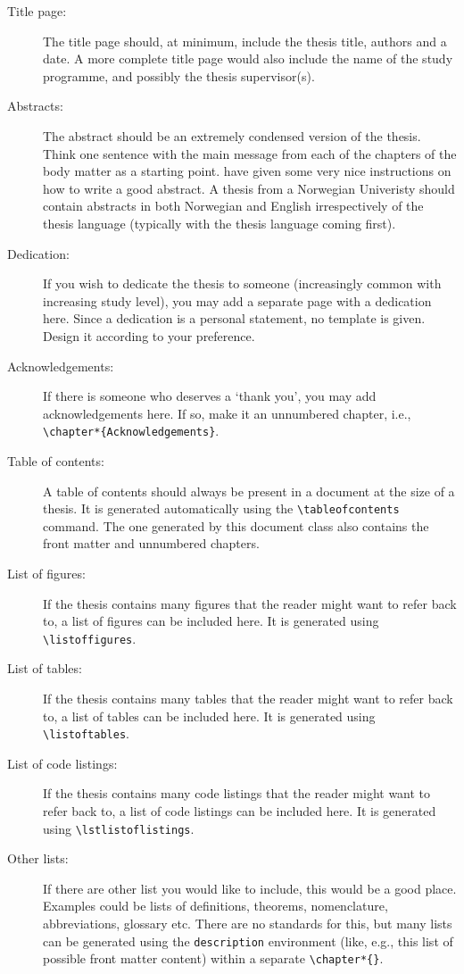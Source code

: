 \begin{description}
    \item[Title page:] The title page should, at minimum, include the thesis title, authors and a date. A more complete title page would also include the name of the study programme, and possibly the thesis supervisor(s). 
    \item[Abstracts:] The abstract should be an extremely condensed version of the thesis. Think one sentence with the main message from each of the chapters of the body matter as a starting point. have given some very nice instructions on how to write a good abstract. A thesis from a Norwegian Univeristy should contain abstracts in both Norwegian and English irrespectively of the thesis language (typically with the thesis language coming first).
    \item[Dedication:] If you wish to dedicate the thesis to someone (increasingly common with increasing study level), you may add a separate page with a dedication here. Since a dedication is a personal statement, no template is given. Design it according to your preference.
    \item[Acknowledgements:] If there is someone who deserves a `thank you', you may add acknowledgements here. If so, make it an unnumbered chapter, i.e., \texttt{\textbackslash chapter*\{Acknowledgements\}}.
    \item[Table of contents:] A table of contents should always be present in a document at the size of a thesis. It is generated automatically using the \texttt{\textbackslash tableofcontents} command. The one generated by this document class also contains the front matter and unnumbered chapters.
    \item[List of figures:] If the thesis contains many figures that the reader might want to refer back to, a list of figures can be included here. It is generated using \texttt{\textbackslash listoffigures}.
    \item[List of tables:] If the thesis contains many tables that the reader might want to refer back to, a list of tables can be included here. It is generated using \texttt{\textbackslash listoftables}.
    \item[List of code listings:] If the thesis contains many code listings that the reader might want to refer back to, a list of code listings can be included here. It is generated using \texttt{\textbackslash lstlistoflistings}.
    \item[Other lists:] If there are other list you would like to include, this would be a good place. Examples could be lists of definitions, theorems, nomenclature, abbreviations, glossary etc. There are no standards for this, but many lists can be generated using the \texttt{description} environment (like, e.g., this list of possible front matter content) within a separate \texttt{\textbackslash chapter*\{\}}.

\end{description}
